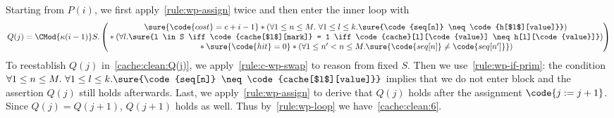 Starting from $P(i)$, we first apply~\ref{rule:wp-assign} twice
and then enter the inner loop with
\begin{align*}
  Q(j) =
      \CMod{\kappa(i-1)} S.
        \begin{pmatrix}
          \sure{\code{cost} = c + i - 1} \ast \left( \forall 1 \leq n\leq M.\  \forall 1 \leq l \leq k. \sure{\code{seq[n]} \neq \code{h[$l$][value]}} \right)\\
             {} \ast \left( \forall l. \sure{l \in S \iff \code{cache[$l$][mark]} = 1 \iff \code{cache}[l][\code{value}] \neq h[l][\code{value}]}\right) \\
             {} \ast \sure{\code{hit} = 0}
             \ast \left(\forall 1 \leq n' < n \leq M. \sure{\code{seq[n]} \neq \code{seq[n']}} \right)\\
        \end{pmatrix}
\end{align*}
To reestablish $Q(j)$ in~\eqref{cache:clean:Q(j)},
we apply~\ref{rule:c-wp-swap} to reason from fixed $S$. Then we
use~\ref{rule:wp-if-prim}:
the condition $ \forall 1 \leq n\leq M.\  \forall 1 \leq l \leq k. \sure{\code{seq[n]} \neq \code{cache[$l$][value]}}$ implies that we do not enter  block and
the assertion $Q(j)$ still holds afterwards. Last, we
apply~\ref{rule:wp-assign} to derive that $Q(j)$ holds
after the assignment $\code{j := j+1}$. Since $Q(j) = Q(j+1)$,
$Q(j + 1)$ holds as well.
Thus by~\ref{rule:wp-loop} we have~\eqref{cache:clean:6}.

